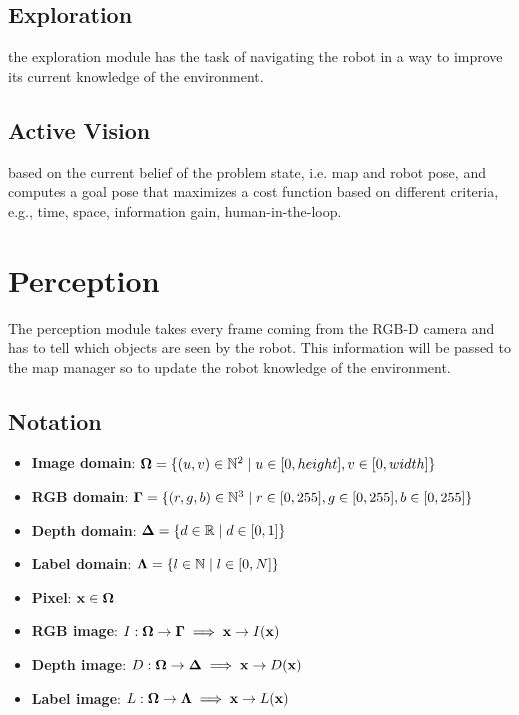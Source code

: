 \documentclass{article}
\begin{document}
	\subsection{Exploration} the exploration module has the task of navigating the robot in a way to improve its current knowledge of the environment. 
	
	\subsection{Active Vision} based on the current belief of the problem state, i.e. map and robot pose, and computes a goal pose that maximizes a cost function based on different criteria, e.g., time, space, information gain, human-in-the-loop.
		
	\section{Perception}

	The perception module takes every frame coming from the RGB-D camera and has to tell which objects are seen by the robot. This information will be passed to the map manager so to update the robot knowledge of the environment.
	
	\subsection{Notation}
	
	\begin{itemize}
		\item {\bf Image domain}: $\mathbf{\Omega} = \{(u,v) \in \mathbb{N}^2 \mid u \in [0,height], v \in [0,width]\}$
		\item {\bf RGB domain}: $\mathbf{\Gamma} = \{(r,g,b) \in \mathbb{N}^3 \mid r \in [0,255], g \in [0,255], b \in [0,255]\}$
		\item {\bf Depth domain}: $\mathbf{\Delta} = \{ d \in \mathbb{R} \mid d \in [0,1]\}$
		\item {\bf Label domain}: $\mathbf{\Lambda} = \{ l \in \mathbb{N} \mid l \in [0,N]\}$
		\item {\bf Pixel}: $\mathbf{x} \in \mathbf{\Omega}$
		\item {\bf RGB image}: $I : \mathbf{\Omega} \rightarrow \mathbf{\Gamma} \implies \mathbf{x} \rightarrow I(\mathbf{x})$
		\item {\bf Depth image}: $D : \mathbf{\Omega} \rightarrow \mathbf{\Delta} \implies \mathbf{x} \rightarrow D(\mathbf{x})$
		\item {\bf Label image}: $L : \mathbf{\Omega} \rightarrow \mathbf{\Lambda} \implies \mathbf{x} \rightarrow L(\mathbf{x})$
	\end{itemize}
	
\end{document}
